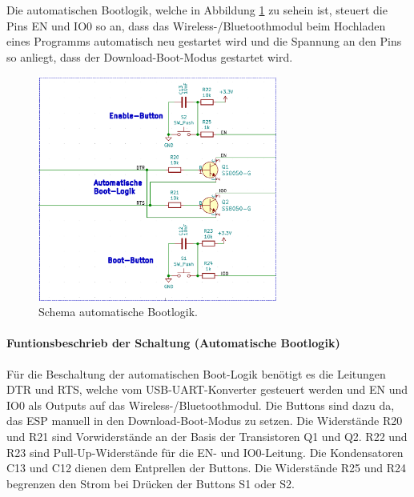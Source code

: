 Die automatischen Bootlogik, welche in Abbildung \ref{fig:Schema_ESP32_Flashbuttons} zu sehein ist, steuert die Pins EN und IO0 so an, dass das Wireless-/Bluetoothmodul beim Hochladen eines Programms automatisch neu gestartet wird und die Spannung an den Pins so anliegt, dass der Download-Boot-Modus gestartet wird.

\begin{figure}[H]
	\centering
	\includegraphics[width=0.7\textwidth]{graphics/Schema_ESP32_Flashbuttons}
	\caption{Schema automatische Bootlogik.}
	\label{fig:Schema_ESP32_Flashbuttons}
\end{figure}

\paragraph{Funtionsbeschrieb der Schaltung (Automatische Bootlogik)}\mbox{}

Für die Beschaltung der automatischen Boot-Logik benötigt es die Leitungen DTR und RTS, welche vom USB-UART-Konverter gesteuert werden und EN und IO0 als Outputs auf das Wireless-/Bluetoothmodul. Die Buttons sind dazu da, das ESP manuell in den Download-Boot-Modus zu setzen.
Die Widerstände R20 und R21 sind Vorwiderstände an der Basis der Transistoren Q1 und Q2. R22 und R23 sind Pull-Up-Widerstände für die EN- und IO0-Leitung. Die Kondensatoren C13 und C12 dienen dem Entprellen der Buttons. Die Widerstände R25 und R24 begrenzen den Strom bei Drücken der Buttons S1 oder S2.

